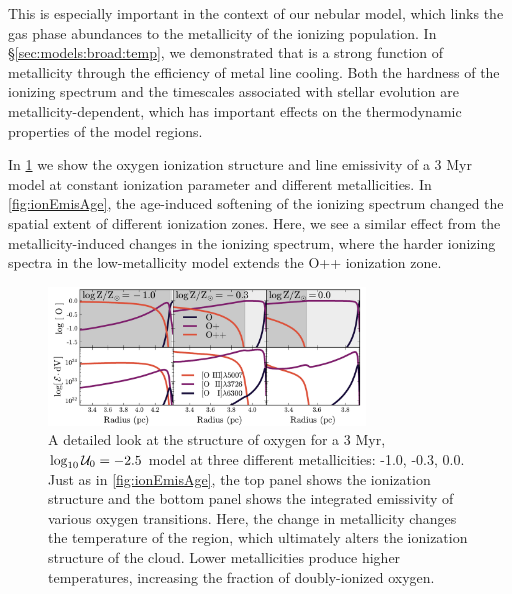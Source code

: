 This is especially important in the context of our nebular model, which links the gas phase abundances to the metallicity of the ionizing population. In \S\ref{sec:models:broad:temp}, we demonstrated that \Te{} is a strong function of metallicity through the efficiency of metal line cooling. Both the hardness of the ionizing spectrum and the timescales associated with stellar evolution are metallicity-dependent, which has important effects on the thermodynamic properties of the model \hii regions.

In \ref{fig:ionEmisZ} we show the oxygen ionization structure and line emissivity of a 3 Myr model at constant ionization parameter and different metallicities. In \ref{fig:ionEmisAge}, the age-induced softening of the ionizing spectrum changed the spatial extent of different ionization zones. Here, we see a similar effect from the metallicity-induced changes in the ionizing spectrum, where the harder ionizing spectra in the low-metallicity model extends the O++ ionization zone.

\begin{figure}[!htbp]
  \begin{centering}
    \includegraphics[width=0.75\textwidth]{manuscript/chapter2/f8.pdf}
    \caption{A detailed look at the structure of oxygen for a 3 Myr, $\log_{10} \mathcal{U}_0 = -2.5$ model at three different metallicities: -1.0, -0.3, 0.0. Just as in \ref{fig:ionEmisAge}, the top panel shows the ionization structure and the bottom panel shows the integrated emissivity of various oxygen transitions. Here, the change in metallicity changes the temperature of the \hii region, which ultimately alters the ionization structure of the cloud. Lower metallicities produce higher temperatures, increasing the fraction of doubly-ionized oxygen.}
    \label{fig:ionEmisZ}
  \end{centering}
\end{figure}

